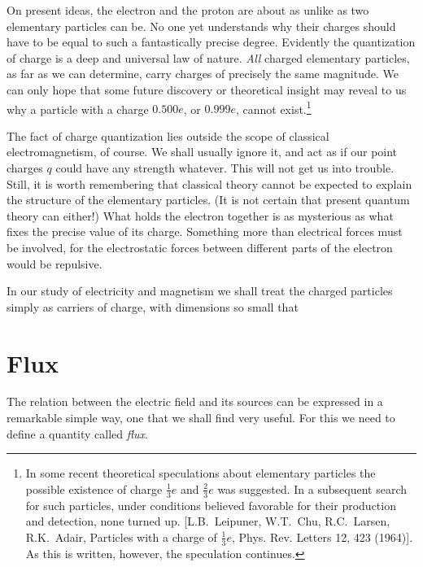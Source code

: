On present ideas, the electron and the proton are about as
unlike as two elementary particles can be. No one yet understands why their
charges should have to be equal to such a fantastically precise degree.
Evidently the quantization of charge is a deep and universal law of nature.
\emph{All} charged elementary particles, as far as we can determine, carry
charges of precisely the same magnitude. We can only hope that some future
discovery or theoretical insight may reveal to us why a particle with a charge
$0.500e$, or $0.999e$, cannot exist.\footnote{In some recent theoretical speculations
about elementary particles the possible existence of charge $\frac{1}{3}e$ and $\frac{2}{3}e$
was suggested. In a subsequent search for such particles, under conditions believed
favorable for their production and detection, none turned up. [L.B.~Leipuner, W.T.~Chu,
R.C.~Larsen, R.K.~Adair, Particles with a charge of $\frac{1}{3}e$, Phys. Rev. Letters 12, 423 (1964)].
As this is written, however, the speculation continues.}

The fact of charge quantization lies outside the scope of
classical electromagnetism, of course. We shall usually ignore it, and act as
if our point charges $q$ could have any strength whatever. This will not get us
into trouble. Still, it is worth remembering that classical theory cannot be
expected to explain the structure of the elementary particles. (It is not
certain that present quantum theory can either!) What holds the electron
together is as mysterious as what fixes the precise value of its charge.
Something more than electrical forces must be involved, for the electrostatic
forces between different parts of the electron would be repulsive. 

In our study of electricity and magnetism we shall treat the
charged particles simply as carriers of charge, with dimensions so small
that


\section{Flux}

The relation between the electric field and its sources can be
expressed in a remarkable simple way, one that we shall find very
useful. For this we need to define a quantity called \emph{flux}.

